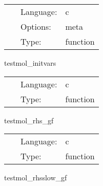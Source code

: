 \hspace{5mm}

 \begin{tabular*}{160mm}{cll} 
~ & Language:  & c \\ 
~ & Options:  & meta \\ 
~ & Type:  & function \\ 
\end{tabular*} 


\vspace{5mm}


\hspace{5mm} testmol\_initvars 

\hspace{5mm}{\it provide initial data for all variables } 


\hspace{5mm}

 \begin{tabular*}{160mm}{cll} 
~ & Language:  & c \\ 
~ & Type:  & function \\ 
\end{tabular*} 


\vspace{5mm}


\hspace{5mm} testmol\_rhs\_gf 

\hspace{5mm}{\it compute the rhs for the evolved grid function } 


\hspace{5mm}

 \begin{tabular*}{160mm}{cll} 
~ & Language:  & c \\ 
~ & Type:  & function \\ 
\end{tabular*} 


\vspace{5mm}


\hspace{5mm} testmol\_rhsslow\_gf 

\hspace{5mm}{\it compute the rhs for the slow evolved grid function } 


\hspace{5mm}

